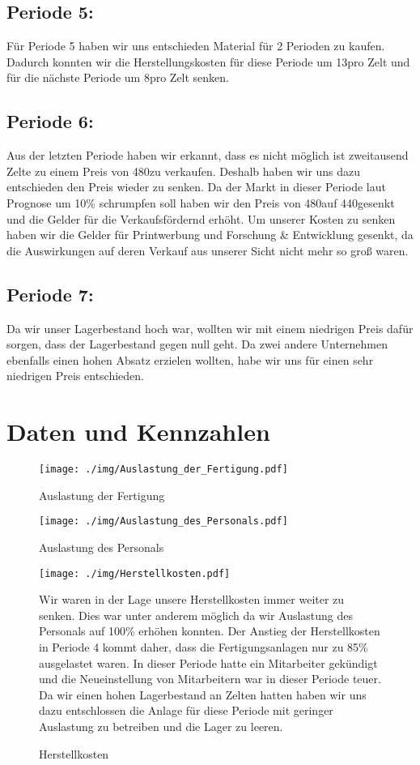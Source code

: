 \documentclass[a4paper, 12pt]{report}
\begin{document}
\begin{flushleft}
\section{Periode 5:}
Für Periode 5 haben wir uns entschieden Material für 2 Perioden zu kaufen.
Dadurch konnten wir die Herstellungskosten für diese Periode um 13\texteuro pro Zelt und für die nächste Periode um 8\texteuro pro Zelt senken.

\section{Periode 6:}
Aus der letzten Periode haben wir erkannt, dass es nicht möglich ist zweitausend Zelte zu einem Preis von 480\texteuro zu verkaufen.
Deshalb haben wir uns dazu entschieden den Preis wieder zu senken.
Da der Markt in dieser Periode laut Prognose um 10\% schrumpfen soll haben wir den Preis von 480\texteuro auf 440\texteuro gesenkt und die Gelder für die Verkaufsfördernd erhöht.
Um unserer Kosten zu senken haben wir die Gelder für Printwerbung und Forschung \& Entwicklung gesenkt, da die Auswirkungen auf deren Verkauf aus unserer Sicht nicht mehr so groß waren.


\section{Periode 7:}
Da wir unser Lagerbestand hoch war, wollten wir mit einem niedrigen Preis dafür sorgen,
dass der Lagerbestand gegen null geht.
Da zwei andere Unternehmen ebenfalls einen hohen Absatz erzielen wollten, habe wir uns für einen sehr niedrigen Preis entschieden.

\newpage
\chapter{Daten und Kennzahlen}
 
 \begin{figure}[th]
 \centering 
 \texttt{[image: ./img/Auslastung\_der\_Fertigung.pdf]}
 \caption[Auslastung der Fertigung]{Auslastung der Fertigung}
  \texttt{[image: ./img/Auslastung\_des\_Personals.pdf]}
  \caption[Auslastung des Personals]{Auslastung des Personals}  
\end{figure}

 
 \begin{figure}[th]
 \centering 
 \texttt{[image: ./img/Herstellkosten.pdf]}
  \caption[Herstellkosten]{Herstellkosten}
\begin{flushleft}
Wir waren in der Lage unsere Herstellkosten immer weiter zu senken. Dies war unter anderem möglich da wir Auslastung des Personals auf 100\% erhöhen konnten. 
Der Anstieg der Herstellkosten in Periode 4 kommt daher, dass die Fertigungsanlagen nur zu 85\% ausgelastet waren.
In dieser Periode hatte ein Mitarbeiter gekündigt und die Neueinstellung von Mitarbeitern war in dieser Periode teuer. Da wir einen hohen Lagerbestand an Zelten hatten haben wir uns dazu entschlossen die Anlage für diese Periode mit geringer Auslastung zu betreiben und die Lager zu leeren.
\end{flushleft}
\end{figure}





\end{flushleft}
\end{document}
